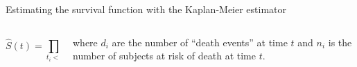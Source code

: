\documentclass[ignorenonframetext,red,8pt,notes=hide]{beamer}
\begin{document}
\begin{frame}
\pause

\begin{block}{Estimating the survival function with the Kaplan-Meier estimator}
\begin{columns}[c]
\begin{column}{0.2\textwidth}
$$
\hat{S}(t) = \prod_{t_i < t} \frac{n_i - d_i}{n_i}
$$
\end{column}

\begin{column}{0.7\textwidth}
where $d_i$ are the number of ``death events'' at time $t$ and $n_i$ is the number of subjects at risk of death at time $t$. 
\end{column}
\end{columns}
\end{block}

\end{frame}
\end{document}
